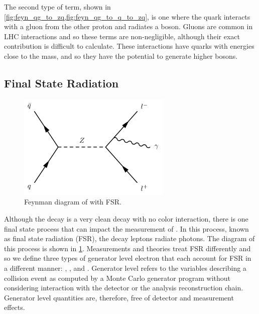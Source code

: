 The second type of term, shown in
\cref{fig:feyn_qg_to_zq,fig:feyn_qg_to_q_to_zq}, is one where the quark
interacts with a gluon from the other proton and radiates a \Z boson. Gluons
are common in LHC interactions and so these terms are non-negligible, although
their exact contribution is difficult to calculate. These interactions have
quarks with energies close to the \Z mass, and so they have the potential to
generate higher \pt \Z bosons.



\subsection{Final State Radiation}
\label{sec:electron_dressing}

\begin{figure}[!htb]
    \centering
    \includegraphics[width=0.65\textwidth]{figures/fsr.pdf}
    \caption{
        Feynman diagram of \Ztoll with FSR.
    }
    \label{fig:fsr_diagram}
\end{figure}

Although the \Ztoee decay is a very clean decay with no color interaction,
there is one final state process that can impact the measurement of \Z
\bosonpt. In this process, known as final state radiation (FSR),  the decay
leptons radiate photons.  The diagram of this process is shown in
\cref{fig:fsr_diagram}. Measurements and theories treat FSR differently and so
we define three types of generator level electron that each account for FSR in
a different manner: \born, \bare, and \dressed. Generator level refers to the
variables describing a collision event as computed by a Monte Carlo generator
program without considering interaction with the detector or the analysis
reconstruction chain. Generator level quantities are, therefore, free of
detector and measurement effects.

